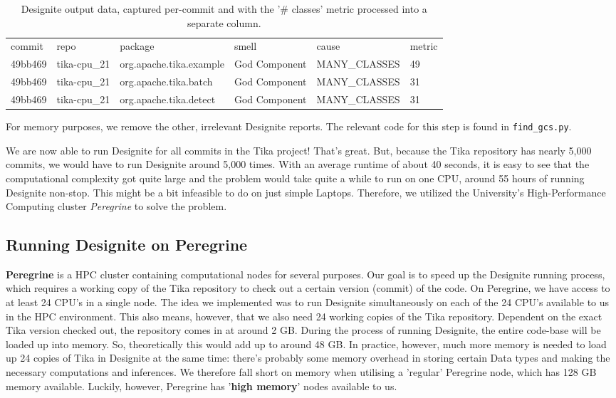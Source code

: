 \documentclass{article}
\begin{document}
\begin{enumerate}
    \begin{table}[ht]
    \begin{tabular}{llllll}
    commit                                   & repo         & package                 & smell         & cause         & metric \\
    49bb469 & tika-cpu\_21 & org.apache.tika.example & God Component & MANY\_CLASSES & 49     \\
    49bb469 & tika-cpu\_21 & org.apache.tika.batch   & God Component & MANY\_CLASSES & 31     \\
    49bb469 & tika-cpu\_21 & org.apache.tika.detect  & God Component & MANY\_CLASSES & 31    
    \end{tabular}
    \caption{Designite output data, captured per-commit and with the '\# classes' metric processed into a separate column.}
    \label{tab:designite-output}
    \end{table}
    
    For memory purposes, we remove the other, irrelevant Designite reports. The relevant code for this step is found in \texttt{find\_gcs.py}.
\end{enumerate}

We are now able to run Designite for all commits in the Tika project! That's great. But, because the Tika repository has nearly 5,000 commits, we would have to run Designite around 5,000 times. With an average runtime of about 40 seconds, it is easy to see that the computational complexity got quite large and the problem would take quite a while to run on one CPU, around 55 hours of running Designite non-stop. This might be a bit infeasible to do on just simple Laptops. Therefore, we utilized the University's High-Performance Computing cluster \textit{Peregrine} to solve the problem.

\subsection{Running Designite on Peregrine}
\textbf{Peregrine} is a HPC cluster containing computational nodes for several purposes. Our goal is to speed up the Designite running process, which requires a working copy of the Tika repository to check out a certain version (commit) of the code. On Peregrine, we have access to at least 24 CPU's in a single node. The idea we implemented was to run Designite simultaneously on each of the 24 CPU's available to us in the HPC environment. This also means, however, that we also need 24 working copies of the Tika repository. Dependent on the exact Tika version checked out, the repository comes in at around 2 GB. During the process of running Designite, the entire code-base will be loaded up into memory. So, theoretically this would add up to around 48 GB. In practice, however, much more memory is needed to load up 24 copies of Tika in Designite at the same time: there's probably some memory overhead in storing certain Data types and making the necessary computations and inferences. We therefore fall short on memory when utilising a 'regular' Peregrine node, which has 128 GB memory available. Luckily, however, Peregrine has '\textbf{high memory}' nodes available to us.
\end{document}
